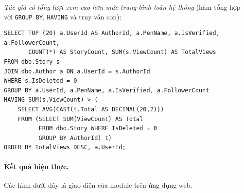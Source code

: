 \textit{Tác giả có tổng lượt xem cao hơn mức trung bình toàn hệ thống} (hàm tổng hợp với \texttt{GROUP BY}, \texttt{HAVING} và truy vấn con):
\begin{verbatim}
SELECT TOP (20) a.UserId AS AuthorId, a.PenName, a.IsVerified, a.FollowerCount,
       COUNT(*) AS StoryCount, SUM(s.ViewCount) AS TotalViews
FROM dbo.Story s
JOIN dbo.Author a ON a.UserId = s.AuthorId
WHERE s.IsDeleted = 0
GROUP BY a.UserId, a.PenName, a.IsVerified, a.FollowerCount
HAVING SUM(s.ViewCount) > (
    SELECT AVG(CAST(t.Total AS DECIMAL(20,2)))
    FROM (SELECT SUM(ViewCount) AS Total
          FROM dbo.Story WHERE IsDeleted = 0
          GROUP BY AuthorId) t)
ORDER BY TotalViews DESC, a.UserId;
\end{verbatim}

\paragraph{Kết quả hiện thực.} Các hình dưới đây là giao diện của module trên ứng dụng web.

